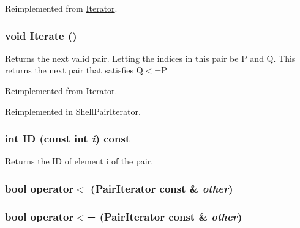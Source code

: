Reimplemented from \hyperlink{classJKBuilder_1_1Iterator_aacb7559eb1b8aab6e7bb6a56602d97ff}{Iterator}.\hypertarget{classJKBuilder_1_1PairIterator_a7874a07e98b52f4f147cde6f39353bae}{
\subsubsection[{Iterate}]{\setlength{\rightskip}{0pt plus 5cm}void Iterate ()}}
\label{classJKBuilder_1_1PairIterator_a7874a07e98b52f4f147cde6f39353bae}


Returns the next valid pair. Letting the indices in this pair be P and Q. This returns the next pair that satisfies Q$<$=P 

Reimplemented from \hyperlink{classJKBuilder_1_1Iterator_a7874a07e98b52f4f147cde6f39353bae}{Iterator}.

Reimplemented in \hyperlink{classJKBuilder_1_1ShellPairIterator_a7874a07e98b52f4f147cde6f39353bae}{ShellPairIterator}.\hypertarget{classJKBuilder_1_1PairIterator_a370ad37c854fbbf6421ebf9ab35cd027}{
\subsubsection[{ID}]{\setlength{\rightskip}{0pt plus 5cm}int ID (const int {\em i}) const}}
\label{classJKBuilder_1_1PairIterator_a370ad37c854fbbf6421ebf9ab35cd027}


Returns the ID of element i of the pair. \hypertarget{classJKBuilder_1_1PairIterator_a1984297ca1081efc0513ec2f5e6a6177}{
\subsubsection[{operator$<$}]{\setlength{\rightskip}{0pt plus 5cm}bool operator$<$ ({\bf PairIterator} const \& {\em other})}}
\label{classJKBuilder_1_1PairIterator_a1984297ca1081efc0513ec2f5e6a6177}
\hypertarget{classJKBuilder_1_1PairIterator_a9c95b8dd7929cb34336a944ce96e88a7}{
\subsubsection[{operator$<$=}]{\setlength{\rightskip}{0pt plus 5cm}bool operator$<$= ({\bf PairIterator} const \& {\em other})}}
\label{classJKBuilder_1_1PairIterator_a9c95b8dd7929cb34336a944ce96e88a7}


